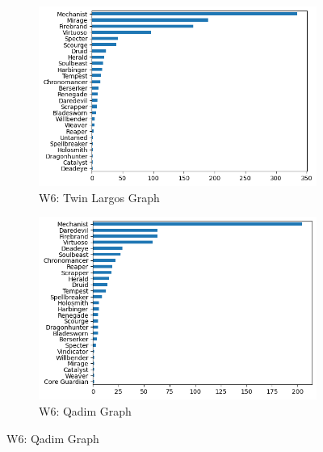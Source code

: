 \documentclass[12pt,a4paper]{article}
\begin{document}
\begin{figure}[h!]
        \begin{subfigure}{0.5\textwidth}
            \centering
            \includegraphics[scale=0.4]{twins_graph.png}
            \caption{\small W6: Twin Largos Graph}
        \end{subfigure}%
        \begin{subfigure}{0.5\textwidth}
            \centering
            \includegraphics[scale=0.4]{q1_graph.png}
            \caption{\small W6: Qadim Graph}
        \end{subfigure}


\end{figure}
\end{document}
